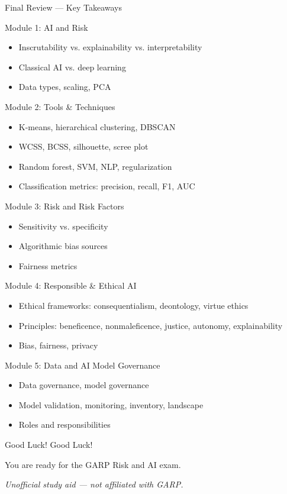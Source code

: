 \documentclass[aspectratio=169,10pt]{beamer}
\begin{document}
	\begin{frame}{Final Review --- Key Takeaways}
		\begin{block}{Module 1: AI and Risk}
			\begin{itemize}
				\item Inscrutability vs. explainability vs. interpretability
				\item Classical AI vs. deep learning
				\item Data types, scaling, PCA
			\end{itemize}
		\end{block}
		\begin{block}{Module 2: Tools \& Techniques}
			\begin{itemize}
				\item K-means, hierarchical clustering, DBSCAN
				\item WCSS, BCSS, silhouette, scree plot
				\item Random forest, SVM, NLP, regularization
				\item Classification metrics: precision, recall, F1, AUC
			\end{itemize}
		\end{block}
		\begin{block}{Module 3: Risk and Risk Factors}
			\begin{itemize}
				\item Sensitivity vs. specificity
				\item Algorithmic bias sources
				\item Fairness metrics
			\end{itemize}
		\end{block}
		\begin{block}{Module 4: Responsible \& Ethical AI}
			\begin{itemize}
				\item Ethical frameworks: consequentialism, deontology, virtue ethics
				\item Principles: beneficence, nonmaleficence, justice, autonomy, explainability
				\item Bias, fairness, privacy
			\end{itemize}
		\end{block}
		\begin{block}{Module 5: Data and AI Model Governance}
			\begin{itemize}
				\item Data governance, model governance
				\item Model validation, monitoring, inventory, landscape
				\item Roles and responsibilities
			\end{itemize}
		\end{block}
	\end{frame}
	
	\begin{frame}{Good Luck!}
		\centering
		\Huge \textcolor{garpblue}{Good Luck!}
		\vspace{1cm}
		
		\Large You are ready for the GARP Risk and AI exam.
		\vspace{1cm}
		
		\normalsize
		\textit{Unofficial study aid --- not affiliated with GARP.}
	\end{frame}
	
\end{document}
